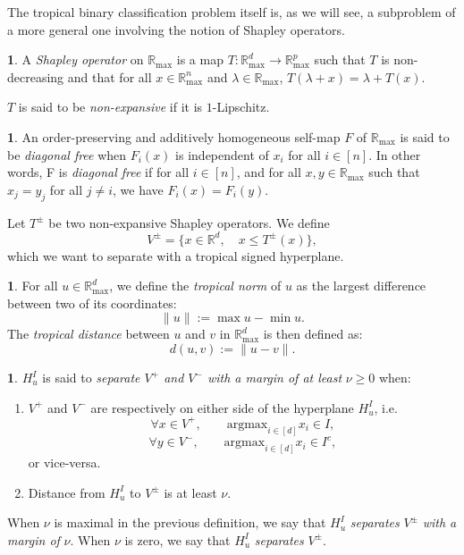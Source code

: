 \documentclass[oneside,english]{amsart}
\numberwithin{equation}{section}
\numberwithin{figure}{section}
\theoremstyle{plain}
\theoremstyle{definition}
\newtheorem{defn}[thm]{\protect\definitionname}
\theoremstyle{plain}
\theoremstyle{remark}
\theoremstyle{plain}
\theoremstyle{definition}
\theoremstyle{definition}
\providecommand{\definitionname}{Definition}
\begin{document}
The tropical binary classification problem itself is, as we will see, a subproblem of a more general one involving the notion of Shapley operators.

\begin{defn}
A \emph{Shapley operator} on $\mathbb{R}_{\max}$ is a map $T:\mathbb{R}_{\max}^{d}\longrightarrow\mathbb{R}_{\max}^{p}$
such that $T$ is non-decreasing and that for all $x\in\mathbb{R}_{\max}^{n}$
and $\lambda\in\mathbb{R}_{\max}$, $T(\lambda + x)=\lambda + T(x)$.

$T$ is said to be \emph{non-expansive }if it is $1$-Lipschitz.
\end{defn}

\begin{defn}
 An order-preserving and additively homogeneous self-map $F$ of
$\mathbb{R}_{\max}$ is said to be \emph{diagonal free} when $F_i(x)$ is independent of $x_i$ for all $i \in [n]$. In
other words, F is \emph{diagonal free} if for all $i \in [n]$, and for all $x,y \in \mathbb{R}_{\max}$ such that
$x_j = y_j$ for all $j \neq i$, we have $F_i(x) = F_i(y)$.   
\end{defn}


Let $T^\pm$ be two non-expansive Shapley operators. We define $$V^\pm = \{x\in\mathbb{R}^d,\quad x\le T^\pm(x)\},$$ which we want to separate with a tropical signed hyperplane.

\begin{defn}
For all $u\in\mathbb{R}_{\max}^{d}$, we define the \emph{tropical
norm} of $u$ as the largest difference between two of its coordinates:
\[
\lVert u\rVert:=\max u-\min u.
\]
The \emph{tropical distance} between $u$ and $v$ in $\mathbb{R}_{\max}^{d}$
is then defined as:
\[
d(u,v):=\lVert u-v\rVert.
\]
\end{defn}

\begin{defn}
$H_{u}^{I}$ is said to \emph{separate $V^{+}$ and $V^{-}$ with
a margin of at least} $\nu\ge0$ when:
\begin{enumerate}
\item $V^{+}$ and $V^{-}$ are respectively on either side of the hyperplane
$H_{u}^{I}$, i.e.
\[
\forall x\in V^{+},\qquad\text{argmax}_{i\in[d]}x_{i}\in I,
\]
\[
\forall y\in V^{-},\qquad\text{argmax}_{i\in[d]}x_{i}\in I^{c},
\]
or vice-versa.
\item Distance from $H_{u}^{I}$ to $V^{\pm}$ is at least $\nu$.
\end{enumerate}
When $\nu$ is maximal in the previous definition, we say that $H_{u}^{I}$
\emph{separates} $V^{\pm}$ \emph{with a margin of} $\nu$. When $\nu$
is zero, we say that $H_{u}^{I}$ \emph{separates} $V^{\pm}$.
\end{defn}
\end{document}
